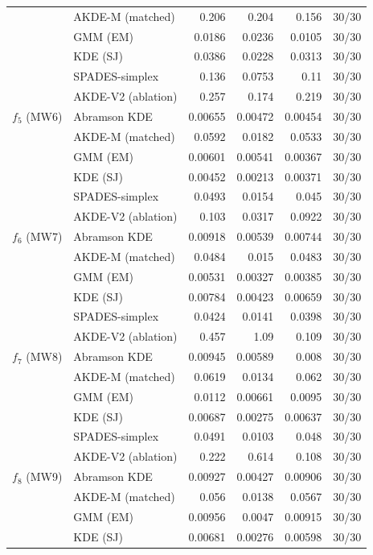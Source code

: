 \begin{tabular}{llrrrr}
 & AKDE-M (matched) & 0.206 & 0.204 & 0.156 & 30/30 \\
 & GMM (EM) & 0.0186 & 0.0236 & 0.0105 & 30/30 \\
 & KDE (SJ) & 0.0386 & 0.0228 & 0.0313 & 30/30 \\
 & SPADES-simplex & 0.136 & 0.0753 & 0.11 & 30/30 \\
 & AKDE-V2 (ablation) & 0.257 & 0.174 & 0.219 & 30/30 \\
$f_{5}$ (MW6) & Abramson KDE & 0.00655 & 0.00472 & 0.00454 & 30/30 \\
 & AKDE-M (matched) & 0.0592 & 0.0182 & 0.0533 & 30/30 \\
 & GMM (EM) & 0.00601 & 0.00541 & 0.00367 & 30/30 \\
 & KDE (SJ) & 0.00452 & 0.00213 & 0.00371 & 30/30 \\
 & SPADES-simplex & 0.0493 & 0.0154 & 0.045 & 30/30 \\
 & AKDE-V2 (ablation) & 0.103 & 0.0317 & 0.0922 & 30/30 \\
$f_{6}$ (MW7) & Abramson KDE & 0.00918 & 0.00539 & 0.00744 & 30/30 \\
 & AKDE-M (matched) & 0.0484 & 0.015 & 0.0483 & 30/30 \\
 & GMM (EM) & 0.00531 & 0.00327 & 0.00385 & 30/30 \\
 & KDE (SJ) & 0.00784 & 0.00423 & 0.00659 & 30/30 \\
 & SPADES-simplex & 0.0424 & 0.0141 & 0.0398 & 30/30 \\
 & AKDE-V2 (ablation) & 0.457 & 1.09 & 0.109 & 30/30 \\
$f_{7}$ (MW8) & Abramson KDE & 0.00945 & 0.00589 & 0.008 & 30/30 \\
 & AKDE-M (matched) & 0.0619 & 0.0134 & 0.062 & 30/30 \\
 & GMM (EM) & 0.0112 & 0.00661 & 0.0095 & 30/30 \\
 & KDE (SJ) & 0.00687 & 0.00275 & 0.00637 & 30/30 \\
 & SPADES-simplex & 0.0491 & 0.0103 & 0.048 & 30/30 \\
 & AKDE-V2 (ablation) & 0.222 & 0.614 & 0.108 & 30/30 \\
$f_{8}$ (MW9) & Abramson KDE & 0.00927 & 0.00427 & 0.00906 & 30/30 \\
 & AKDE-M (matched) & 0.056 & 0.0138 & 0.0567 & 30/30 \\
 & GMM (EM) & 0.00956 & 0.0047 & 0.00915 & 30/30 \\
 & KDE (SJ) & 0.00681 & 0.00276 & 0.00598 & 30/30 \\

\end{tabular}
